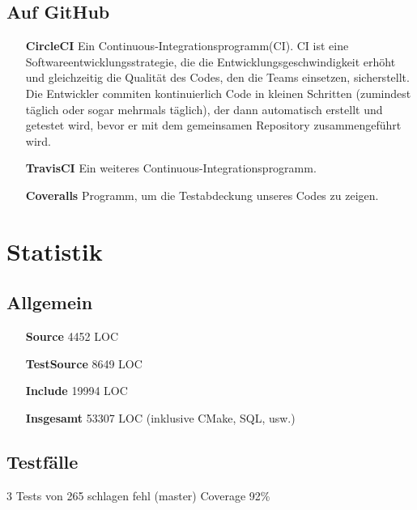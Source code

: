 \documentclass[a4paper,12pt]{article}
\begin{document}
\subsection{Auf GitHub}
\begin{itemize}

	\item[\textbf{CircleCI}]\hspace{1cm} Ein Continuous-Integrationsprogramm(CI). CI ist eine Softwareentwicklungsstrategie, die die Entwicklungsgeschwindigkeit erhöht und gleichzeitig die Qualität des Codes, den die Teams einsetzen, sicherstellt. Die Entwickler commiten kontinuierlich Code in kleinen Schritten (zumindest täglich oder sogar mehrmals täglich), der dann automatisch erstellt und getestet wird, bevor er mit dem gemeinsamen Repository zusammengeführt wird.
	
	\item[\textbf{TravisCI}]\hspace{1cm} Ein weiteres Continuous-Integrationsprogramm.
	
	\item[\textbf{Coveralls}]\hspace{1cm} Programm, um die Testabdeckung unseres Codes zu zeigen.
	
\end{itemize}
\section{Statistik}
\subsection{Allgemein}
\begin{itemize}
	\item[\textbf{Source}]\hspace{1cm} 4452 LOC
	\item[\textbf{TestSource}]\hspace{1cm} 8649 LOC
	\item[\textbf{Include}]\hspace{1cm} 19994 LOC
	\item[\textbf{Insgesamt}]\hspace{1cm} 53307 LOC (inklusive CMake, SQL, usw.)
\end{itemize}
	
\subsection{Testfälle}
3 Tests von 265 schlagen fehl (master)
Coverage 92\%
\end{document}
